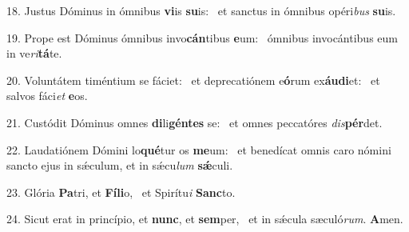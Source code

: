 18. Justus Dóminus in ómnibus \textbf{vi}is \textbf{su}is: \ast\  et sanctus in ómnibus opéri\textit{bus} \textbf{su}is.\

19. Prope est Dóminus ómnibus invo\textbf{cán}tibus \textbf{e}um: \ast\  ómnibus invocántibus eum in ve\textit{ri}\textbf{tá}te.\

20. Voluntátem timéntium se fáciet: \dag\  et deprecatiónem e\textbf{ó}rum ex\textbf{áu}\textbf{di}et: \ast\  et salvos fáci\textit{et} \textbf{e}os.\

21. Custódit Dóminus omnes \textbf{di}li\textbf{gén}\textbf{tes} se: \ast\  et omnes peccatóres \textit{dis}\textbf{pér}det.\

22. Laudatiónem Dómini lo\textbf{qué}tur os \textbf{me}um: \ast\  et benedícat omnis caro nómini sancto ejus in sǽculum, et in sǽcu\textit{lum} \textbf{sǽ}culi.\

23. Glória \textbf{Pa}tri, et \textbf{Fí}\textbf{li}o, \ast\  et Spirítu\textit{i} \textbf{Sanc}to.\

24. Sicut erat in princípio, et \textbf{nunc}, et \textbf{sem}per, \ast\  et in sǽcula sæculó\textit{rum}. \textbf{A}men.\

